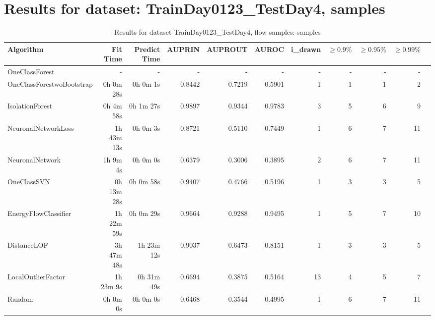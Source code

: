 \documentclass{article}
\begin{document}
\section*{Results for dataset: TrainDay0123_TestDay4, samples}
\begin{table}[h!]
\centering
\caption{Results for dataset TrainDay0123_TestDay4, flow samples: samples}
\begin{tabular}{lrrrrrrrrrr}
\toprule
Algorithm & Fit Time & Predict Time & AUPRIN & AUPROUT & AUROC & i\_drawn & $\geq 0.9\%$ & $\geq 0.95\%$ & $\geq 0.99\%$ \\
\midrule
OneClassForest & - & - & - & - & - & - & - & - & - \\
OneClassForestwoBootstrap & 0h 0m 28s & 0h 0m 1s & 0.8442 & 0.7219 & 0.5901 & 1 & 1 & 1 & 2 \\
IsolationForest & 0h 4m 58s & 0h 1m 27s & 0.9897 & 0.9344 & 0.9783 & 3 & 5 & 6 & 9 \\
NeuronalNetworkLoss & 1h 43m 13s & 0h 0m 3s & 0.8721 & 0.5110 & 0.7449 & 1 & 6 & 7 & 11 \\
NeuronalNetwork & 1h 9m 4s & 0h 0m 0s & 0.6379 & 0.3006 & 0.3895 & 2 & 6 & 7 & 11 \\
OneClassSVN & 0h 13m 28s & 0h 0m 58s & 0.9407 & 0.4766 & 0.5196 & 1 & 3 & 3 & 5 \\
EnergyFlowClassifier & 1h 22m 59s & 0h 0m 29s & 0.9664 & 0.9288 & 0.9495 & 1 & 5 & 7 & 10 \\
DistanceLOF & 3h 47m 48s & 1h 23m 12s & 0.9037 & 0.6473 & 0.8151 & 1 & 3 & 3 & 5 \\
LocalOutlierFactor & 1h 23m 9s & 0h 31m 49s & 0.6694 & 0.3875 & 0.5164 & 13 & 4 & 5 & 7 \\
Random & 0h 0m 0s & 0h 0m 0s & 0.6468 & 0.3544 & 0.4995 & 1 & 6 & 7 & 11 \\
\bottomrule
\end{tabular}
\end{table}
\end{document}

